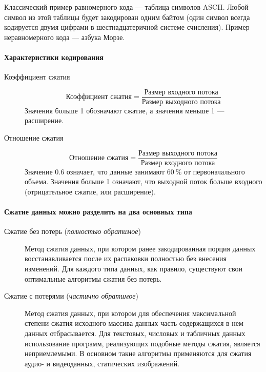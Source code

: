 Классический пример равномерного кода --- таблица символов ASCII.
Любой символ из этой таблицы будет закодирован одним байтом (один символ всегда кодируется двумя цифрами в шестнадцатеричной системе счисления).
Пример неравномерного кода --- азбука Морзе.

\paragraph{Характеристики кодирования}\label{par:compression-characteristics}

\begin{description}
    \item [Коэффициент сжатия]
          \[
              \text{Коэффициент сжатия} = \frac{\text{Размер входного потока}}{\text{Размер выходного потока}}
          \]
          Значения больше 1 обозначают сжатие, а значения меньше 1 --- расширение.
    \item [Отношение сжатия]
          \[
              \text{Отношение сжатия} = \frac{\text{Размер выходного потока}}{\text{Размер входного потока}}
          \]
          Значение $\num{0.6}$ означает, что данные занимают $\qty{60}{\percent}$ от первоначального объема.
          Значения больше 1 означают, что выходной поток больше входного (отрицательное сжатие, или расширение).
\end{description}

\paragraph{Сжатие данных можно разделить на два основных типа}\label{par:compression-types}

\begin{description}
    \item [Сжатие без потерь (\emph{полностью обратимое})]
          Метод сжатия данных, при котором ранее закодированная порция данных восстанавливается после их распаковки полностью без внесения изменений.
          Для каждого типа данных, как правило, существуют свои оптимальные алгоритмы сжатия без потерь.
    \item [Сжатие с потерями (\emph{частично обратимое})]
          Метод сжатия данных, при котором для обеспечения максимальной степени сжатия исходного массива данных часть содержащихся в нем данных отбрасывается.
          Для текстовых, числовых и табличных данных использование программ, реализующих подобные методы сжатия, является неприемлемыми.
          В основном такие алгоритмы применяются для сжатия аудио- и видеоданных, статических изображений.
\end{description}

